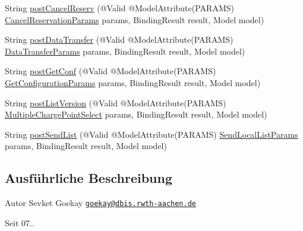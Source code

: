 \begin{DoxyCompactItemize}
\item 
String \hyperlink{classde_1_1rwth_1_1idsg_1_1steve_1_1web_1_1controller_1_1_ocpp15_controller_a4808ec098a5c7a0b7e47e7c78db5403f}{post\-Cancel\-Reserv} (@Valid @Model\-Attribute(P\-A\-R\-A\-M\-S) \hyperlink{classde_1_1rwth_1_1idsg_1_1steve_1_1web_1_1dto_1_1ocpp15_1_1_cancel_reservation_params}{Cancel\-Reservation\-Params} params, Binding\-Result result, Model model)
\item 
String \hyperlink{classde_1_1rwth_1_1idsg_1_1steve_1_1web_1_1controller_1_1_ocpp15_controller_a5215a4fd19ab0b8a063f3c5f73d37a96}{post\-Data\-Transfer} (@Valid @Model\-Attribute(P\-A\-R\-A\-M\-S) \hyperlink{classde_1_1rwth_1_1idsg_1_1steve_1_1web_1_1dto_1_1ocpp15_1_1_data_transfer_params}{Data\-Transfer\-Params} params, Binding\-Result result, Model model)
\item 
String \hyperlink{classde_1_1rwth_1_1idsg_1_1steve_1_1web_1_1controller_1_1_ocpp15_controller_a502ca343be380b47b41bf00ca9e99fb2}{post\-Get\-Conf} (@Valid @Model\-Attribute(P\-A\-R\-A\-M\-S) \hyperlink{classde_1_1rwth_1_1idsg_1_1steve_1_1web_1_1dto_1_1ocpp15_1_1_get_configuration_params}{Get\-Configuration\-Params} params, Binding\-Result result, Model model)
\item 
String \hyperlink{classde_1_1rwth_1_1idsg_1_1steve_1_1web_1_1controller_1_1_ocpp15_controller_a59cf8a9a10a1906b87ca423e1c4e470e}{post\-List\-Version} (@Valid @Model\-Attribute(P\-A\-R\-A\-M\-S) \hyperlink{classde_1_1rwth_1_1idsg_1_1steve_1_1web_1_1dto_1_1common_1_1_multiple_charge_point_select}{Multiple\-Charge\-Point\-Select} params, Binding\-Result result, Model model)
\item 
String \hyperlink{classde_1_1rwth_1_1idsg_1_1steve_1_1web_1_1controller_1_1_ocpp15_controller_af537bbbcf063cb6b7e0d2aead2e80311}{post\-Send\-List} (@Valid @Model\-Attribute(P\-A\-R\-A\-M\-S) \hyperlink{classde_1_1rwth_1_1idsg_1_1steve_1_1web_1_1dto_1_1ocpp15_1_1_send_local_list_params}{Send\-Local\-List\-Params} params, Binding\-Result result, Model model)
\end{DoxyCompactItemize}


\subsection{Ausführliche Beschreibung}
\begin{DoxyAuthor}{Autor}
Sevket Goekay \href{mailto:goekay@dbis.rwth-aachen.de}{\tt goekay@dbis.\-rwth-\/aachen.\-de} 
\end{DoxyAuthor}
\begin{DoxySince}{Seit}
07.. 
\end{DoxySince}


